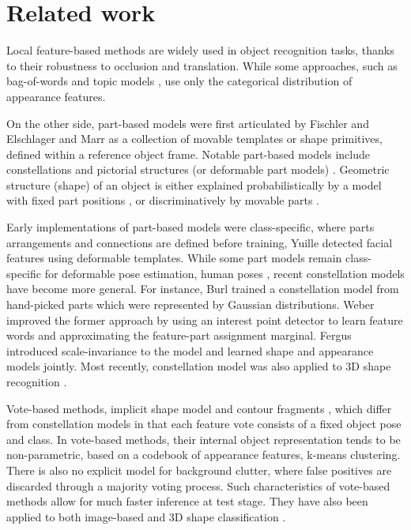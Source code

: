 \section{Related work}
\label{sec/reg/relatedwork}

Local feature-based methods are widely used in object recognition tasks, thanks to their robustness to occlusion and translation. While some approaches, such as bag-of-words \cite{Sivic2005, Fei-Fei2005} and topic models \cite{Fergus2005}, use only the categorical distribution of appearance features. 

On the other side, part-based models were first articulated by Fischler and Elschlager \cite{Fischler1973} and Marr \cite{Marr1982} as a collection of movable templates or shape primitives, defined within a reference object frame. Notable part-based models include constellations \cite{Weber2000, Fergus2007} and pictorial structures (or deformable part models) \cite{Felzenszwalb2005}. Geometric structure (shape) of an object is either explained probabilistically by a model with fixed part positions \cite{Fergus2007}, or discriminatively by movable parts \cite{Yuille1989, Felzenszwalb2005}.

Early implementations of part-based models were class-specific, where parts arrangements and connections are defined before training, \eg Yuille \etal \cite{Yuille1989} detected facial features using deformable templates. While some part models remain class-specific for deformable pose estimation, \eg human poses \cite{Yang2011, Eichner2012}, recent constellation models have become more general. For instance, Burl \etal \cite{Burl1998} trained a constellation model from hand-picked parts which were represented by Gaussian distributions. Weber \etal \cite{Weber2000} improved the former approach by using an interest point detector \cite{Kadir2001} to learn feature words and approximating the feature-part assignment marginal. Fergus \etal \cite{Fergus2007} introduced scale-invariance to the model and learned shape and appearance models jointly. Most recently, constellation model was also applied to 3D shape recognition \cite{MuktaPrasad2011}.

Vote-based methods, \eg implicit shape model \cite{Leibe2008} and contour fragments \cite{Shotton2008a}, which differ from constellation models in that each feature vote consists of a fixed object pose and class. In vote-based methods, their internal object representation tends to be non-parametric, based on a codebook of appearance features, \eg k-means clustering. There is also no explicit model for background clutter, where false positives are discarded through a majority voting process. Such characteristics of vote-based methods allow for much faster inference at test stage. They have also been applied to both image-based \cite{Leibe2008, Shotton2008} and 3D shape classification \cite{Flitton2010,  Knopp2010, Pham2011, Barinova2010}.

